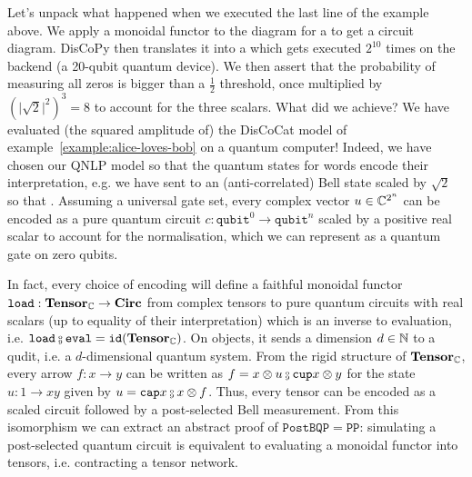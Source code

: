 Let's unpack what happened when we executed the last line of the example above.
We apply a monoidal functor  to the diagram for a  to get a circuit diagram.
DisCoPy then translates it into a  which gets executed $2^{10}$ times on the  backend (a 20-qubit quantum device).
We then assert that the probability of measuring all zeros is bigger than a $\frac{1}{2}$ threshold, once multiplied by $(\vert \sqrt{2} \vert^2)^3 = 8$ to account for the three scalars.
What did we achieve?
We have evaluated (the squared amplitude of) the DisCoCat model of example~\ref{example:alice-loves-bob} on a quantum computer!
Indeed, we have chosen our QNLP model so that the quantum states for words encode their interpretation, e.g. we have sent  to an (anti-correlated) Bell state scaled by $\sqrt{2}$ so that  \py{= [[0, 1], [1, 0]]}.
Assuming a universal gate set, every complex vector $u \in \mathbb{C}^{2^n}$ can be encoded as a pure quantum circuit $c : \mathtt{qubit}^0 \to \mathtt{qubit}^n$ scaled by a positive real scalar to account for the normalisation, which we can represent as a quantum gate on zero qubits.

In fact, every choice of encoding will define a faithful monoidal functor $\mathtt{load} : \mathbf{Tensor}_{\mathbb{C}} \to \mathbf{Circ}$ from complex tensors to pure quantum circuits with real scalars (up to equality of their interpretation) which is an inverse to evaluation, i.e. $\mathtt{load} \fcmp \mathtt{eval} = \id(\mathbf{Tensor}_\C)$.
On objects, it sends a dimension $d \in \mathbb{N}$ to a qudit, i.e. a $d$-dimensional quantum system.
From the rigid structure of $\mathbf{Tensor}_{\mathbb{C}}$, every arrow $f : x \to y$ can be written as $f = x \otimes u \fcmp \ttcup{x} \otimes y$ for the state $u : 1 \to x y$ given by $u = \ttcap{x} \fcmp x \otimes f$.
Thus, every tensor can be encoded as a scaled circuit followed by a post-selected Bell measurement.
From this isomorphism we can extract an abstract proof of $\mathtt{PostBQP} = \mathtt{PP}$: simulating a post-selected quantum circuit is equivalent to evaluating a monoidal functor into tensors, i.e. contracting a tensor network.


